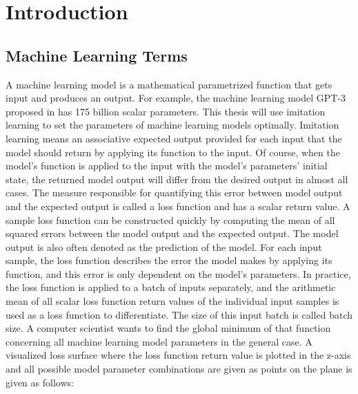 \documentclass[draft,final]{vutinfth} %
\begin{document}

    \tableofcontents %

    \mainmatter

    \chapter{Introduction}

    \section{Machine Learning Terms}
    A machine learning model is a mathematical parametrized function that gets input and produces an output.
    For example, the machine learning model GPT-3 proposed in \cite{GPT-3} has 175 billion scalar parameters.
    This thesis will use imitation learning to set the parameters of machine learning models optimally.
    Imitation learning means an associative expected output provided for each input that the model should return by applying its function to the input.
    Of course, when the model's function is applied to the input with the model's parameters' initial state, the returned model output will differ from the desired output in almost all cases.
    The measure responsible for quantifying this error between model output and the expected output is called a loss function and has a scalar return value.
    A sample loss function can be constructed quickly by computing the mean of all squared errors between the model output and the expected output.
    The model output is also often denoted as the prediction of the model.
    For each input sample, the loss function describes the error the model makes by applying its function, and this error is only dependent on the model's parameters.
    In practice, the loss function is applied to a batch of inputs separately, and the arithmetic mean of all scalar loss function return values of the individual input samples is used as a loss function to differentiate.
    The size of this input batch is called batch size.
    A computer scientist wants to find the global minimum of that function concerning all machine learning model parameters in the general case.
    A visualized loss surface where the loss function return value is plotted in the z-axis and all possible model parameter combinations are given as points on the plane is given as follows:
\end{document}
